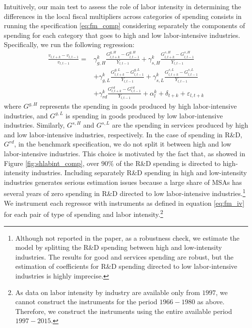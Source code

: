 \documentclass[dv_diss_main.tex]{subfiles}
\begin{document}
Intuitively, our main test to assess the role of labor intensity in determining the differences in the local fiscal multipliers across categories of spending consists in running the specification \ref{eq:fm_comp} considering separately the components of spending for each category that goes to high and low labor-intensive industries. Specifically, we run the following regression: 
\begin{equation}
\begin{split}
    \frac{v_{l,t+k} - v_{l,t-1}}{v_{l,t-1}}  = & \gamma_{g,H}^k \frac{G^{g,H}_{l,t+k}-G^{g,H}_{l,t-1}}{Y_{l,t-1}} + 
     \gamma_{s,H}^k  \frac{G^{s,H}_{l,t+k}-G^{s,H}_{l,t-1}}{Y_{l,t-1}} \\[0.1in] 
    & + \gamma_{g,L}^k \frac{G^{g,L}_{l,t+k}-G^{g,L}_{l,t-1}}{Y_{l,t-1}}
     + \gamma_{s,L}^k \frac{G^{s,L}_{l,t+k}-G^{s,L}_{l,t-1}}{Y_{l,t-1}}  
    \\[0.1in] 
    & + \gamma_{rd}^k \frac{G^{rd}_{l,t+k}-G^{rd}_{l,t-1}}{Y_{l,t-1}} + \alpha_l^k + \delta_{t+k} + \varepsilon_{l,t+k}
\end{split}
\label{eq:fm_comp_labint}
\end{equation}
where $G^{g,H}$ represents the spending in goods produced by high labor-intensive industries, and $G^{g,L}$ is spending in goods produced by low labor-intensive industries. Similarly,  $G^{s,H}$ and $G^{s,L}$ are the spending in services produced by high and low labor-intensive industries, respectively. In the case of spending in R\&D, $G^{rd}$, in the benchmark specification, we do not split it between high and low labor-intensive industries. This choice is motivated by the fact that, as showed in Figure \ref{fig:shlabint_comp}, over $90\%$ of the R\&D spending is directed to high-intensity industries. Including separately R\&D spending in high and low-intensity industries generates serious estimation issues because a large share of MSAs has several years of zero spending in R\&D directed to low labor-intensive industries.\footnote{Although not reported in the paper, as a robustness check, we estimate the model by splitting the R\&D spending between high and low-intensity industries. The results for good and services spending are robust, but the estimation of coefficients for R\&D spending directed to low labor-intensive industries is highly imprecise.} We instrument each regressor with instruments as defined in equation \eqref{eq:fm_iv} for each pair of type of spending and labor intensity.\footnote{As data on labor intensity by industry are available only from $1997$, we cannot construct the instruments for the period $1966-1980$ as above. Therefore, we construct the instruments using the entire available period $1997-2015$.}
\end{document}
